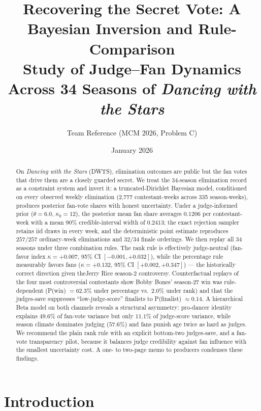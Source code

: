 \documentclass{article}
\title{Recovering the Secret Vote: A Bayesian Inversion and Rule-Comparison \\
Study of Judge--Fan Dynamics Across 34 Seasons of \emph{Dancing with the Stars}}
\author{Team Reference (MCM 2026, Problem C)}
\date{January 2026}
\begin{document}
\maketitle

\begin{abstract}
On \emph{Dancing with the Stars} (DWTS), elimination outcomes are public but the fan votes that drive them are a closely guarded secret. We treat the 34-season elimination record as a constraint system and invert it: a truncated-Dirichlet Bayesian model, conditioned on every observed weekly elimination (2{,}777 contestant-weeks across 335 season-weeks), produces posterior fan-vote shares with honest uncertainty. Under a judge-informed prior ($\theta=6.0$, $\kappa_0=12$), the posterior mean fan share averages $0.1206$ per contestant-week with a mean 90\% credible-interval width of $0.2413$; the exact rejection sampler retains iid draws in every week, and the deterministic point estimate reproduces $257/257$ ordinary-week eliminations and $32/34$ finale orderings. We then replay all 34 seasons under three combination rules. The rank rule is effectively judge-neutral (fan-favor index $\kappa = +0.007$, 95\% CI $[-0.001, +0.032]$), while the percentage rule measurably favors fans ($\kappa = +0.132$, 95\% CI $[+0.002, +0.347]$) --- the historically correct direction given theJerry Rice season-2 controversy. Counterfactual replays of the four most controversial contestants show Bobby Bones' season-27 win was rule-dependent (P(win) $=62.3\%$ under percentage vs.\ $2.0\%$ under rank) and that the judges-save suppresses ``low-judge-score'' finalists to P(finalist) $\approx 0.14$. A hierarchical Beta model on both channels reveals a structural asymmetry: pro-dancer identity explains $49.6\%$ of fan-vote variance but only $11.1\%$ of judge-score variance, while season climate dominates judging ($57.6\%$) and fans punish age twice as hard as judges. We recommend the plain rank rule with an explicit bottom-two judges-save, and a fan-vote transparency pilot, because it balances judge credibility against fan influence with the smallest uncertainty cost. A one- to two-page memo to producers condenses these findings.
\end{abstract}

\tableofcontents
\newpage

\section{Introduction}
\end{document}
